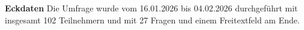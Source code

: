 \begin{frame}{\textbf{Eckdaten}}
    Die Umfrage wurde vom 16.01.2026 bis 04.02.2026 durchgeführt mit insgesamt 102 Teilnehmern und mit 27 Fragen und einem Freitextfeld am Ende.
\end{frame}